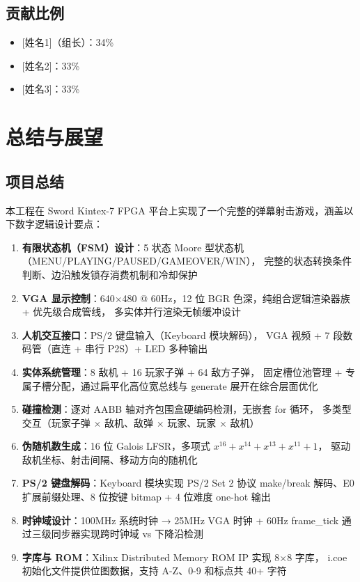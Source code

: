 \documentclass[12pt,a4paper]{ctexart}
\begin{document}
\subsection{贡献比例}

\begin{itemize}
    \item {[姓名1]}（组长）：34\%
    \item {[姓名2]}：33\%
    \item {[姓名3]}：33\%
\end{itemize}


\section{总结与展望}

\subsection{项目总结}

本工程在 Sword Kintex-7 FPGA 平台上实现了一个完整的弹幕射击游戏，涵盖以下数字逻辑设计要点：

\begin{enumerate}[label=(\arabic*)]
    \item \textbf{有限状态机（FSM）设计}：5 状态 Moore 型状态机（MENU/PLAYING/PAUSED/GAMEOVER/WIN），
    完整的状态转换条件判断、边沿触发锁存消费机制和冷却保护
    \item \textbf{VGA 显示控制}：640$\times$480 @ 60Hz，12 位 BGR 色深，纯组合逻辑渲染器族 + 优先级合成管线，
    多实体并行渲染无帧缓冲设计
    \item \textbf{人机交互接口}：PS/2 键盘输入（Keyboard 模块解码），
    VGA 视频 + 7 段数码管（直连 + 串行 P2S）+ LED 多种输出
    \item \textbf{实体系统管理}：8 敌机 + 16 玩家子弹 + 64 敌方子弹，
    固定槽位池管理 + 专属子槽分配，通过扁平化高位宽总线与 generate 展开在综合层面优化
    \item \textbf{碰撞检测}：逐对 AABB 轴对齐包围盒硬编码检测，无嵌套 for 循环，
    多类型交互（玩家子弹 $\times$ 敌机、敌弹 $\times$ 玩家、玩家 $\times$ 敌机）
    \item \textbf{伪随机数生成}：16 位 Galois LFSR，多项式 $x^{16}+x^{14}+x^{13}+x^{11}+1$，
     驱动敌机坐标、射击间隔、移动方向的随机化
    \item \textbf{PS/2 键盘解码}：Keyboard 模块实现 PS/2 Set 2 协议 make/break 解码、E0 扩展前缀处理、8 位按键 bitmap + 4 位难度 one-hot 输出
    \item \textbf{时钟域设计}：100MHz 系统时钟 → 25MHz VGA 时钟 + 60Hz frame\_tick
    通过三级同步器实现跨时钟域 vs 下降沿检测
    \item \textbf{字库与 ROM}：Xilinx Distributed Memory ROM IP 实现 8$\times$8 字库，
    i.coe 初始化文件提供位图数据，支持 A-Z、0-9 和标点共 40+ 字符
\end{enumerate}
\end{document}
